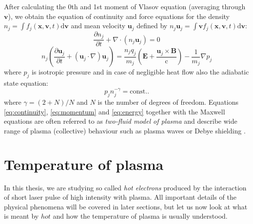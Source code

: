 After calculating the 0th and 1st moment of Vlasov equation (averaging through $\bm{v}$), we obtain the equation of continuity and force equations for the density $n_j = \int f_j\left(\bm{x},\bm{v},t\right)\mathrm{d}\bm{v}$ and mean velocity $\bm{u}_j$ defined by $n_j\bm{u}_j = \int \bm{v} f_j\left(\bm{x},\bm{v},t\right)\mathrm{d}\bm{v}$:
\begin{equation}
	\label{eq:continuity}
	\frac{\partial n_j}{\partial t} + \nabla\cdot\left(n_j \bm{u}_j\right) = 0
\end{equation}
\begin{equation}
	\label{eq:momentum}
	n_j \left(\frac{\partial \bm{u}_j}{\partial t} + \left(\bm{u}_j\cdot\nabla\right)\bm{u}_j\right) = \frac{n_j q_j}{m_j}\left(\bm{E} + \frac{\bm{u}_j\times\bm{B}}{\mathrm{c}}\right) - \frac{1}{m_j}\nabla p_j
\end{equation}
\noindent where $p_j$ is isotropic pressure and in case of negligible heat flow also the adiabatic state equation:
\begin{equation}
	\label{eq:energy}
	p_jn_j^{-\gamma} = \mathrm{const.}.
\end{equation}
\noindent where $\gamma = \left(2+N\right)/N$ and $N$ is the number of degrees of freedom. Equations \ref{eq:continuity}, \ref{eq:momentum} and \ref{eq:energy} together with the Maxwell equations are often referred to as \textit{two-fluid model of plasma} and describe wide range of plasma (collective) behaviour such as plasma waves or Debye shielding \cite{laser-plasma4}.

\section{Temperature of plasma}
\label{sec:temperature-intro}
In this thesis, we are studying so called \textit{hot electrons} produced by the interaction of short laser pulse of high intensity with plasma. All important details of the physical phenomena will be covered in later sections, but let us now look at what is meant by $hot$ and how the temperature of plasma is usually understood.

